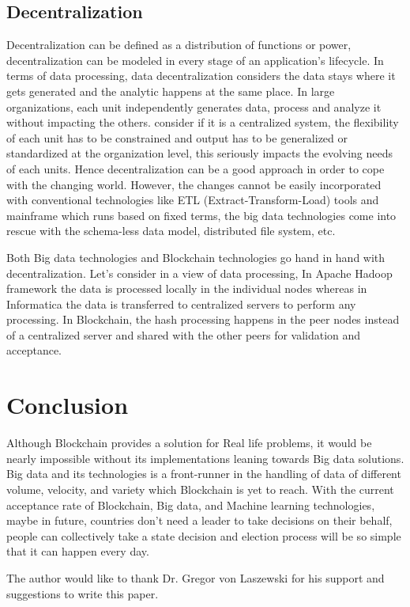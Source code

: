 \documentclass[sigconf]{acmart}
\begin{document}
\subsection{Decentralization}
Decentralization can be defined as a distribution of functions or power\cite{Dictionery}, decentralization can be modeled in every stage of an application's lifecycle. In terms of data processing, data decentralization considers the data stays where it gets generated and the analytic happens at the same place. In large organizations, each unit independently generates data, process and analyze it without impacting the others. consider if it is a centralized system, the flexibility of each unit has to be constrained and output has to be generalized or standardized at the organization level, this seriously impacts the evolving needs of each units\cite{IsDataDe19:online}. Hence decentralization can be a good approach in order to cope with the changing world. However, the changes cannot be easily incorporated with conventional technologies like ETL (Extract-Transform-Load) tools and mainframe which runs based on fixed terms, the big data technologies come into rescue with the schema-less data model, distributed file system, etc.

Both Big data technologies and Blockchain technologies go hand in hand with decentralization. Let's consider in a view of data processing, In Apache Hadoop framework the data is processed locally in the individual nodes whereas in Informatica the data is transferred to centralized servers to perform any processing\cite{Informat9:online}. In Blockchain, the hash processing happens in the peer nodes instead of a centralized server and shared with the other peers for validation and acceptance.


\section{Conclusion}
Although Blockchain provides a solution for Real life problems, it would be nearly impossible without its implementations leaning towards Big data solutions. Big data and its technologies is a front-runner in the handling of data of different volume, velocity, and variety which Blockchain is yet to reach. With the current acceptance rate of Blockchain, Big data, and Machine learning technologies, maybe in future, countries don't need a leader to take decisions on their behalf, people can collectively take a state decision and election process will be so simple that it can happen every day.


\begin{acks}

  The author would like to thank Dr. Gregor von Laszewski for his
  support and suggestions to write this paper.

\end{acks}


 
\end{document}

